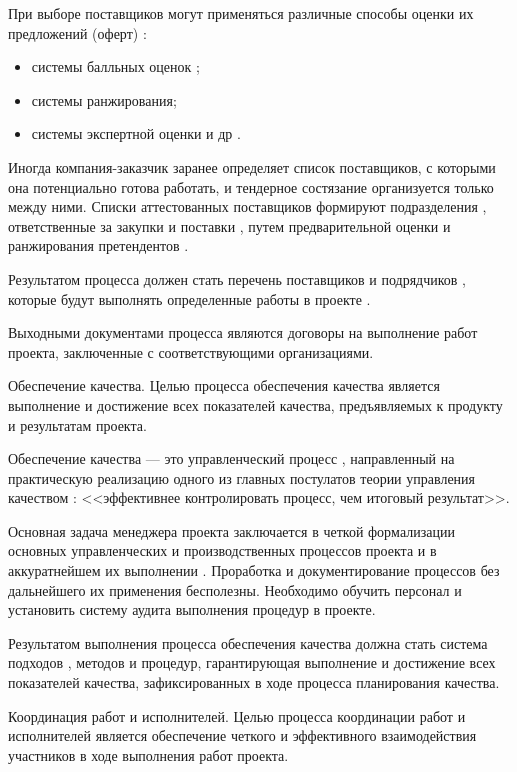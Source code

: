 При выборе поставщиков могут применяться различные способы оценки их предложений (оферт) :
\begin{itemize}
	\item системы балльных оценок ;
	\item системы ранжирования;
	\item системы экспертной оценки и др .
\end{itemize}

Иногда компания-заказчик заранее определяет список поставщиков, с которыми она потенциально готова работать, и тендерное состязание организуется только между ними.
Списки аттестованных поставщи­ков формируют подразделения , ответственные за закупки и поставки , путем предварительной оценки и ранжирования претендентов .

Результатом процесса должен стать перечень поставщиков и подряд­чиков , которые будут выполнять определенные работы в проекте .

Выходными документами процесса являются договоры на выпол­нение работ проекта, заключенные с соответствующими организа­циями.

Обеспечение качества.
Целью процесса обеспечения качества является выполнение и дости­жение всех показателей качества, предъявляемых к продукту и ре­зультатам проекта.

Обеспечение качества --- это управленческий процесс , направлен­ный на практическую реализацию одного из главных постулатов тео­рии управления качеством : <<эффективнее контролировать процесс, чем итоговый результат>>.

Основная задача менеджера проекта заключается в четкой фор­мализации основных управленческих и производственных процессов проекта и в аккуратнейшем их выполнении .
Проработка и документи­рование процессов без дальнейшего их применения бесполезны.
Необходимо обучить персонал и установить систему аудита выполнения процедур в проекте.

Результатом выполнения процесса обеспечения качества должна стать система подходов , методов и процедур, гарантирующая выполнение и достижение всех показателей качества, зафиксированных в ходе про­цесса планирования качества.

Координация работ и исполнителей.
Целью процесса координации работ и исполнителей является обес­печение четкого и эффективного взаимодействия участников в ходе выполнения работ проекта.

